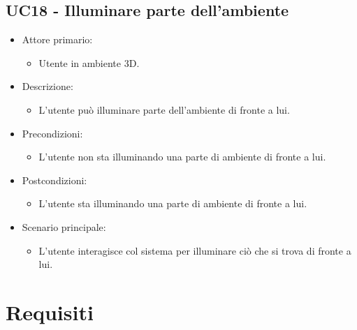 \subsection{UC18 - Illuminare parte dell'ambiente}
\begin{itemize}

	\item Attore primario: 
	\begin{itemize}
		\item Utente in ambiente 3D.
	\end{itemize}
	\item Descrizione:
	\begin{itemize}
		\item L'utente può illuminare parte dell'ambiente di fronte a lui.
	\end{itemize}
	
	\item Precondizioni:
	\begin{itemize}
		\item L'utente non sta illuminando una parte di ambiente di fronte a lui.
	\end{itemize}
	
	\item Postcondizioni:
	\begin{itemize}
		\item L'utente sta illuminando una parte di ambiente di fronte a lui.
	\end{itemize}
	
	\item Scenario principale:
	\begin{itemize}
		\item L'utente interagisce col sistema per illuminare ciò che si trova di fronte a lui.
	\end{itemize}
	
\end{itemize}

\pagebreak


\section{Requisiti}

